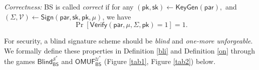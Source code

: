 \documentclass[conference]{IEEEtran}
\begin{document}
	\textit{Correctness:} \textsf{BS} is called \textit{correct} if for  any $ (\textsf{pk},\textsf{sk}) \leftarrow \textsf{KeyGen}(\mathsf{par}),$ and $ 
	(\Sigma, \mathcal{V}) \leftarrow \textsf{Sign}(\mathsf{par},\mathsf{sk}, \textsf{pk},\mu)$, we have
	$$\Pr[\textsf{Verify}(\mathsf{par}, \mu, \Sigma, \textsf{pk})=1]=1.$$
	
	For security, a blind  signature scheme should be \textit{blind} and  \textit{one-more unforgeable}.  
	We formally define these properties in Definition \ref{bli} and Definition \ref{on}  through the games $ \textsf{Blind}_{\textsf{BS}}^{\mathcal{S}^*}$ and  $\textsf{OMUF}_{\textsf{BS}}^{\mathcal{U}^*}$ (Figure \ref{tab1}, Figure \ref{tab2}) below.
	
	
	
	
	
\end{document}
